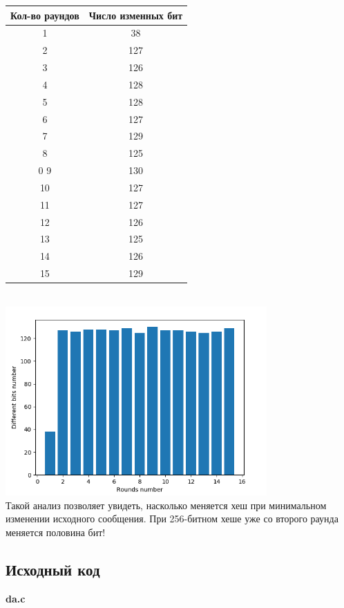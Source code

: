 \documentclass[12pt]{article}
\begin{document}
\begin{tabular}{ | c | c | }
\hline
Кол-во раундов & Число изменных бит \\ \hline
1 & 38 \\ \hline
2 & 127 \\ \hline
3 & 126 \\ \hline
4 & 128 \\ \hline
5 & 128 \\ \hline
6 & 127 \\ \hline
7 & 129 \\ \hline
8 & 125 \\ \hline0
9 & 130 \\ \hline
10 & 127 \\ \hline
11 & 127 \\ \hline
12 & 126 \\ \hline
13 & 125 \\ \hline
14 & 126 \\ \hline
15 & 129 \\ \hline
\end{tabular}
\\
\includegraphics[width=100mm, scale=0.5]{images/bar.png}\\

Такой анализ позволяет увидеть, насколько меняется хеш при минимальном изменении исходного сообщения.
При 256-битном хеше уже со второго раунда меняется половина бит!

\subsection*{Исходный код}
\textbf{da.c}

\end{document}

